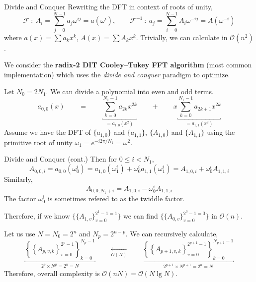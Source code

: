 \documentclass[10pt,table]{beamer}
\begin{document}
\begin{frame}{Divide and Conquer}
Rewriting the DFT in context of roots of unity,
\begin{equation*}
\mathcal{F}\::\:A_i=\sum_{j=0}^{N-1}a_j\omega^{ij}=a(\omega^i),\qquad\mathcal{F}^{-1}\::\:a_j=\sum_{i=0}^{N-1}A_i\omega^{-ij}=A(\omega^{-i})
\end{equation*}
where $a(x)=\sum a_kx^k$, $A(x)=\sum A_kx^k$. Trivially, we can calculate in $\mathcal{O}(n^2)$.

We consider the \textbf{radix-2 DIT Cooley–Tukey FFT algorithm} (most common implementation) which uses the \textit{divide and conquer} paradigm to optimize.

Let $N_0=2N_1$. We can divide a polynomial into even and odd terms.
\begin{equation*}
a_{0,0}(x)\qquad=\qquad\underbracket{\sum_{k=0}^{N_1-1}a_{2k}x^{2k}}_{=a_{1,0}(x^2)}\qquad+\qquad x\underbracket{\sum_{k=0}^{N_1-1}a_{2k+1}x^{2k}}_{=a_{1,1}(x^2)}
\end{equation*}
Assume we have the DFT of $\{a_{1,0}\}$ and $\{a_{1,1}\}$, $\{A_{1,0}\}$ and $\{A_{1,1}\}$ using the primitive root of unity $\omega_1=e^{-i2\pi/N_1}=\omega^2$.
\end{frame}

\begin{frame}{Divide and Conquer (cont.)}
Then for $0\leq i<N_1$,
\begin{equation*}
A_{0,0,i}=a_{0,0}(\omega_0^{i})=a_{1,0}(\omega_1^{i})+\omega_0^ia_{1,1}(\omega_1^{i})=A_{1,0,i}+\omega_0^iA_{1,1,i}
\end{equation*}
Similarly,
\begin{equation*}
A_{0,0,N_1+i}=A_{1,0,i}-\omega_0^iA_{1,1,i}
\end{equation*}
The factor $\omega_0^i$ is sometimes refered to as the twiddle factor.

Therefore, if we know $\{\{A_{1,v}\}_{v=0}^{2^1-1=1}\}$ we can find $\{\{A_{0,v}\}_{v=0}^{2^0-1=0}\}$ in $\mathcal{O}(n)$.

\vfill

Let us use $N=N_0=2^n$ and $N_p=2^{n-p}$. We can recursively calculate,
\begin{equation*}
\underbracket{\left\{\left\{A_{p,v,k}\right\}_{v=0}^{2^p-1}\right\}_{k=0}^{N_p-1}}_{2^p\times N^p=2^n=N}\qquad\underset{\mathcal{O}(N)}{\longleftarrow}\qquad\underbracket{\left\{\left\{A_{p+1,v,k}\right\}_{v=0}^{2^{p+1}-1}\right\}_{k=0}^{N_{p+1}-1}}_{2^{p+1}\times N^{p+1}=2^n=N}
\end{equation*}
Therefore, overall complexity is $\mathcal{O}(nN)=\mathcal{O}(N\lg N)$.
\end{frame}
\end{document}
